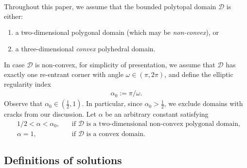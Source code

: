 \documentclass[11pt,reqno]{amsart}
\theoremstyle{definition}
\numberwithin{equation}{section}
\newcommand{\bff}{\boldsymbol}
\newcommand{\bb}{\mathbb}
\begin{document}
Throughout this paper, we assume that the bounded polytopal domain $\mathscr{D}$ is either: 
	\begin{enumerate}
		\item a two-dimensional polygonal domain (which may be \emph{non-convex}), or
		\item a three-dimensional \emph{convex} polyhedral domain.
	\end{enumerate}
	In case $\mathscr{D}$ is non-convex, for simplicity of presentation, we assume that $\mathscr{D}$ has exactly one re-entrant corner with angle $\omega\in (\pi,2\pi)$, and define the elliptic regularity index
	\begin{align}\label{equ:gamma 0}
		\alpha_0 := \pi/\omega.
	\end{align}
	Observe that $\alpha_0 \in (\frac12,1)$. In particular, since $\alpha_0> \frac12$, we exclude domains with cracks from our discussion. Let $\alpha$ be an arbitrary constant satisfying
    \begin{equation}\label{equ:condition alpha}
		\begin{aligned}
			& 1/2 <\alpha<\alpha_0,
			&&\,\text{if $\mathscr{D}$ is a two-dimensional non-convex polygonal domain},
			\\
			& \alpha=1,
			&&\,\text{if $\mathscr{D}$ is a convex domain}.
		\end{aligned}
	\end{equation}
	
	



\subsection{Definitions of solutions}
\end{document}
